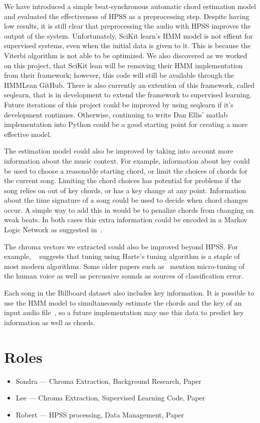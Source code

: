 \documentclass{article}
\begin{document}
We have introduced a simple beat-synchronous automatic chord estimation model
and evaluated the effectiveness of HPSS as a preprocessing step. Despite having low
results, it is still clear that preprocessing the audio with HPSS improves the
output of the system. Unfortunately, SciKit learn's HMM model is not effient for
supervised systems, even when the initial data is given to it. This is because the
Viterbi algorithm is not able to be optimized. We also discovered as we worked
on this project, that SciKit lean will be removing their HMM implementation from
their framework; however, this code will still be available through the HMMLean GitHub.
There is also currently an extention of this framework, called seqlearn, that is in 
development to extend the framework to supervised learning. Future iterations
of this project could be improved by using seqlearn if it's development continues. 
Otherwise, continuing to write Dan Ellis' matlab implementation into Python could
be a good starting point for creating a more effective model.

The estimation model could also be improved by taking into account more
information about the music context. For example, information about key could
be used to choose a reasonable starting chord, or limit the choices of chords
for the current song. Limiting the chord choices has potential for problems if
the song relies on out of key chords, or has a key change at any point.
Information about the time signature of a song could be used to decide when
chord changes occur. A simple way to add this in would be to penalize chords
from changing on weak beats. In both cases this extra information could be
encoded in a Markov Logic Network as suggested in~\cite{Papadopoulus:04}.

The chroma vectors we extracted could also be improved beyond HPSS. For
example, ~\cite{McVicar:00} suggests that
tuning using Harte's tuning algorithm is a staple of most modern algorithms.
Some older papers such as~\cite{Zenz:20} mention micro-tuning of the human
voice as well as percussive sounds as sources of classification error.

Each song in the Billboard dataset also includes key information. It is
possible to use the HMM model to simultaneously estimate the chords and the key
of an input audio file~\cite{McVicar:00}, so a future implementation may use
this data to predict key information as well as chords.

\section{Roles}
\begin{itemize}
    \item Sondra --- Chroma Extraction, Background Research, Paper
    \item Lee --- Chroma Extraction, Supervised Learning Code, Paper
    \item Robert --- HPSS processing, Data Management, Paper
\end{itemize}
\end{document}
